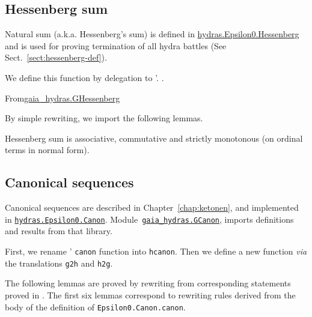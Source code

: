  


\subsection{Hessenberg sum}

Natural sum  (a.k.a. Hessenberg's  sum) is defined in
\href{../theories/html/hydras.Epsilon0.Hessenberg.html}{hydras.Epsilon0.Hessenberg} and is used for proving termination of all hydra battles (See Sect.~\ref{sect:hessenberg-def}).

We define this function by delegation to \HydrasLib'.
\vspace{4pt} 
\noindent.

From\href{../theories/html/gaia\_hydras.GHessenberg.html}{gaia\_hydras.GHessenberg}


By simple rewriting, we import the following lemmas.



Hessenberg sum is associative, commutative and strictly monotonous (on ordinal terms in normal form).







\subsection{Canonical sequences}
\label{sect:gcanon}
Canonical sequences are described in Chapter~\vref{chap:ketonen}, and implemented in
\href{../theories/html/hydras.Epsilon0.Canon.html}%
{\texttt{hydras.Epsilon0.Canon}}.
Module~\href{../theories/html/gaia_hydras.GCanon.html}%
{\texttt{gaia\_hydras.GCanon}}, imports definitions and results from that library.



First, we rename \HydrasLib' \texttt{canon} function into
\texttt{hcanon}. Then we define a new function \emph{via} the
translations \texttt{g2h} and \texttt{h2g}.




The following lemmas are proved by rewriting from corresponding statements proved in \HydrasLib. The first six lemmas correspond to rewriting rules derived from the body of the definition of \texttt{Epsilon0.Canon.canon}.




